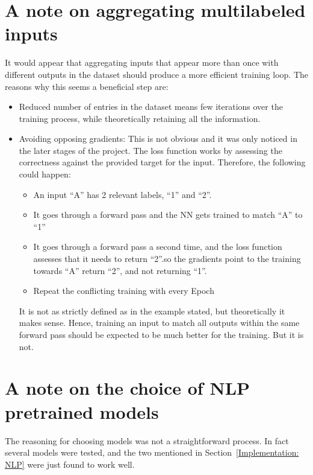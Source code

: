 \documentclass[a4paper, 11pt]{report}
\begin{document}
\section{A note on aggregating multilabeled inputs}\label{Apx: A note on aggregating multilabeled inputs}
    It would appear that aggregating inputs that appear more than once with different outputs in the dataset should produce a more efficient training loop. The reasons why this seems a beneficial step are:
    \begin{itemize}
        \item Reduced number of entries in the dataset means few iterations over the training process, while theoretically retaining all the information.
        \item Avoiding opposing gradients: This is not obvious and it was only noticed in the later stages of the project. The loss function works by assessing the correctness against the provided target for the input. Therefore, the following could happen:
        \begin{itemize}
            \item An input ``A'' has 2 relevant labels, ``1'' and ``2''.
            \item It goes through a forward pass and the NN gets trained to match ``A'' to ``1''
            \item It goes through a forward pass a second time, and the loss function assesses that it needs to return ``2''.so the gradients point to the training towards ``A'' return ``2'', and not returning ``1''.
            \item Repeat the conflicting training with every Epoch
        \end{itemize}
        It is not as strictly defined as in the example stated, but theoretically it makes sense. Hence, training an input to match all outputs within the same forward pass should be expected to be much better for the training. But it is not.
    \end{itemize}

\section{A note on the choice of NLP pretrained models}\label{Apx: A note on the choice of NLP pretrained models}

    The reasoning for choosing models was not a straightforward process. In fact several models were tested, and the two mentioned in Section~\ref{Implementation: NLP} were just found to work well.
\end{document}
